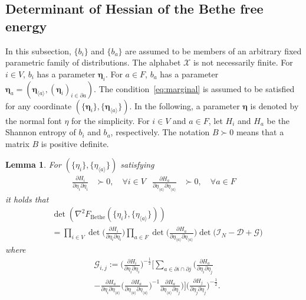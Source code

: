 \documentclass[a4paper,10pt,twoside,twocolumn,openany,final]{memoir}
\theoremstyle{plain}
\newtheorem{lemma}[theorem]{Lemma}
\theoremstyle{definition}
\theoremstyle{remark}
\begin{document}
\subsection{Determinant of Hessian of the Bethe free energy}
In this subsection, $\{b_i\}$ and $\{b_a\}$ are assumed to be members of an arbitrary fixed parametric family of distributions. 
The alphabet $\mathcal{X}$ is not necessarily finite.
For $i\in V$, $b_i$ has a parameter $\bm{\eta}_i$.
For $a\in F$, $b_a$ has a parameter $\bm{\eta}_a=(\bm{\eta}_{\langle a\rangle}, (\bm{\eta}_i)_{i\in\partial a})$.
The condition~\eqref{eq:marginal} is assumed to be satisfied for any coordinate $(\{\bm{\eta}_i\}, \{\bm{\eta}_{\langle a\rangle}\})$.
In the following, a parameter $\bm{\eta}$ is denoted by the normal font $\eta$ for the simplicity.
For $i\in V$ and $a\in F$, let $H_i$ and $H_a$ be the Shannon entropy of $b_i$ and $b_a$, respectively.
The notation $B\succ 0$ means that a matrix $B$ is positive definite.
\begin{lemma}
For $(\{\eta_i\}, \{\eta_{\langle a\rangle}\})$ satisfying
\begin{align*}
\frac{\partial H_i}{\partial \eta_i \partial \eta_i} &\succ 0,\quad\forall i\in V&
\frac{\partial H_a}{\partial \eta_{\langle a\rangle} \partial \eta_{\langle a\rangle}} &\succ 0,\quad\forall a\in F
\end{align*}
it holds that
\begin{align*}
&\det(\nabla^2 F_\mathrm{Bethe}(\{\eta_i\}, \{\eta_{\langle a\rangle}\})) \\
&=
\prod_{i\in V} \det\Big(\frac{\partial H_i}{\partial \eta_i \partial \eta_i}\Big)
\prod_{a\in F} \det\Big(\frac{\partial H_a}{\partial \eta_{\langle a\rangle} \partial \eta_{\langle a\rangle}}\Big)
\det\big(\mathcal{I}_{N} - \mathcal{D} + \mathcal{G}\big)
\end{align*}
where
\begin{align*}
&\mathcal{G}_{i,j} :=
\bigg(\frac{\partial H_i}{\partial \eta_i\partial \eta_i}\bigg)^{-\frac12}
 \bigg[\sum_{a\in \partial i\cap \partial j}
\bigg(
\frac{\partial H_a}{\partial \eta_i\partial \eta_j}
\\
&-
 \frac{\partial H_a}{\partial \eta_i\partial \eta_{\langle a\rangle}}
\bigg(\frac{\partial H_a}{\partial \eta_{\langle a\rangle}\partial \eta_{\langle a\rangle}}\bigg)^{-1}
 \frac{\partial H_a}{\partial \eta_{\langle a\rangle}\partial \eta_j}
\bigg)\bigg]
\bigg(\frac{\partial H_j}{\partial \eta_j\partial \eta_j}\bigg)^{-\frac12}.
\end{align*}
\end{lemma}
\end{document}

